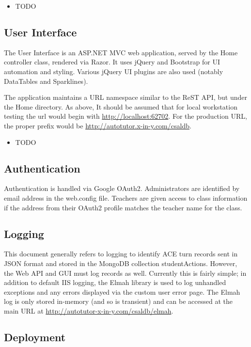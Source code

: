 \documentclass[letterpaper,10pt]{article}
\begin{document}
\begin{itemize}
    \item TODO
\end{itemize}

\subsection{User Interface}
\label{web:gui}
The User Interface is an ASP.NET MVC web application, served by the Home controller
class, rendered via Razor.  It uses jQuery and Bootstrap for UI automation
and styling.  Various jQuery UI plugins are also used (notably DataTables and
Sparklines).

The application maintains a URL namespace similar to the ReST API, but under
the Home directory.  As above, It should be assumed that for local
workstation testing the url would begin with \url{http://localhost:62702}.  For
the production URL, the proper prefix would be 
\url{http://autotutor.x-in-y.com/csaldb}.

\begin{itemize}
    \item TODO
\end{itemize}

\subsection{Authentication}

Authentication is handled via Google OAuth2.  Administrators are identified
by email address in the web.config file.  Teachers are given access to class
information if the address from their OAuth2 profile matches the teacher name
for the class.

\subsection{Logging}

This document generally refers to logging to identify ACE turn records
sent in JSON format and stored in the MongoDB collection studentActions.
However, the Web API and GUI must log records as well.  Currently this is
fairly simple; in addition to default IIS logging, the Elmah library is
used to log unhandled exceptions and any errors displayed via the custom
user error page.  The Elmah log is only stored in-memory (and so is transient)
and can be accessed at the main URL at
\url{http://autotutor-x-in-y.com/csaldb/elmah}.

\subsection{Deployment}
\label{subsec:deploy}
\end{document}
